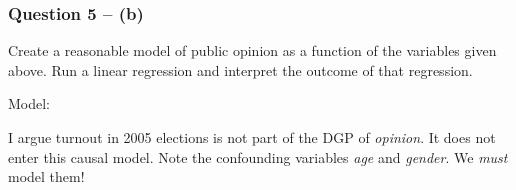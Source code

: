 \documentclass[xcolor=table]{beamer}
\begin{document}


\begin{frame}[fragile]
\frametitle{Question 5 -- (b)}
Create a reasonable model of public opinion as a function of the variables given above. Run a linear regression and interpret the outcome of that regression. \pause

Model:
\begin{center}
\end{center} \pause

I argue turnout in 2005 elections is not part of the DGP of \textit{opinion}. It does not enter this causal model. \pause Note the confounding variables \textit{age} and \textit{gender}. We \textit{must} model them!
\end{frame}
\end{document}

